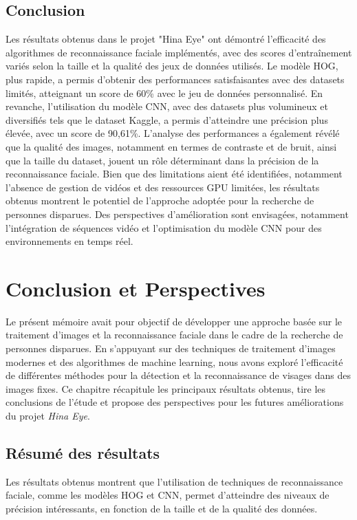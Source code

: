 \documentclass[a4paper,12pt]{report}
\begin{document}
\section{Conclusion}
Les résultats obtenus dans le projet "Hina Eye" ont démontré l'efficacité des algorithmes de reconnaissance faciale implémentés, avec des scores d'entraînement variés selon la taille et la qualité des jeux de données utilisés. Le modèle HOG, plus rapide, a permis d'obtenir des performances satisfaisantes avec des datasets limités, atteignant un score de 60\% avec le jeu de données personnalisé. En revanche, l'utilisation du modèle CNN, avec des datasets plus volumineux et diversifiés tels que le dataset Kaggle, a permis d’atteindre une précision plus élevée, avec un score de 90,61\%.
L'analyse des performances a également révélé que la qualité des images, notamment en termes de contraste et de bruit, ainsi que la taille du dataset, jouent un rôle déterminant dans la précision de la reconnaissance faciale. Bien que des limitations aient été identifiées, notamment l'absence de gestion de vidéos et des ressources GPU limitées, les résultats obtenus montrent le potentiel de l’approche adoptée pour la recherche de personnes disparues. Des perspectives d'amélioration sont envisagées, notamment l'intégration de séquences vidéo et l'optimisation du modèle CNN pour des environnements en temps réel.

\chapter{Conclusion et Perspectives}
Le présent mémoire avait pour objectif de développer une approche basée sur le traitement d’images et la reconnaissance faciale dans le cadre de la recherche de personnes disparues. En s’appuyant sur des techniques de traitement d'images modernes et des algorithmes de machine learning, nous avons exploré l’efficacité de différentes méthodes pour la détection et la reconnaissance de visages dans des images fixes. Ce chapitre récapitule les principaux résultats obtenus, tire les conclusions de l’étude et propose des perspectives pour les futures améliorations du projet \textit{Hina Eye}.

\section{Résumé des résultats}
Les résultats obtenus montrent que l’utilisation de techniques de reconnaissance faciale, comme les modèles HOG et CNN, permet d’atteindre des niveaux de précision intéressants, en fonction de la taille et de la qualité des données.
\end{document}
